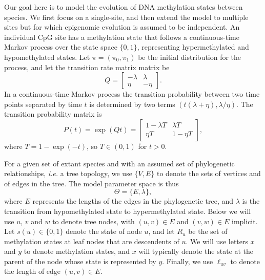 \documentclass[11pt]{article}
\begin{document}
Our goal here is to model the evolution of DNA methylation states
between species. We first focus on a single-site, and then extend the
model to multiple sites but for which epigenomic evolution is assumed
to be independent. An individual CpG site has a methylation state that
follows a continuous-time Markov process over the state space $\{0,
1\}$, representing hypermethylated and hypomethylated states. Let
$\pi=(\pi_0, \pi_1)$ be the initial distribution for the process, and
let the transition rate matrix matrix be
\[
Q=\begin{bmatrix}
-\lambda & \lambda\\
    \eta & -\eta
\end{bmatrix}.
\]
In a continuous-time Markov process the transition probability between
two time points separated by time $t$ is determined by two terms
$(t(\lambda + \eta), \lambda/\eta)$. The transition probability matrix
is
\[
P(t) = \exp(Qt) =
\begin{bmatrix}
  1 - \lambda T & \lambda T \\
         \eta T & 1 - \eta T
\end{bmatrix},
\]
where $T = 1 - \exp(-t)$, so $T\in (0,1)$ for $t > 0$.

For a given set of extant species and with an assumed set of
phylogenetic relationships, {\it i.e.} a tree topology, we use $\{V,
E\}$ to denote the sets of vertices and of edges in the tree. The
model parameter space is thus
\[
\Theta=\{E,\lambda\},
\]
where $E$ represents the lengths of the edges in the phylogenetic
tree, and $\lambda$ is the transition from hypomethylated state to
hypermethylated state. Below we will use $u$, $v$ and $w$ to denote
tree nodes, with $(u, v)\in E$ and $(v, w)\in E$ implicit. Let $s(u)
\in \{0, 1\}$ denote the state of node $u$, and let $R_u$ be the set
of methylation states at leaf nodes that are descendents of $u$.  We
will use letters $x$ and $y$ to denote methylation states, and $x$
will typically denote the state at the parent of the node whose state
is represented by $y$. Finally, we use $\ell_{uv}$ to denote the
length of edge $(u, v)\in E$.


\end{document}

